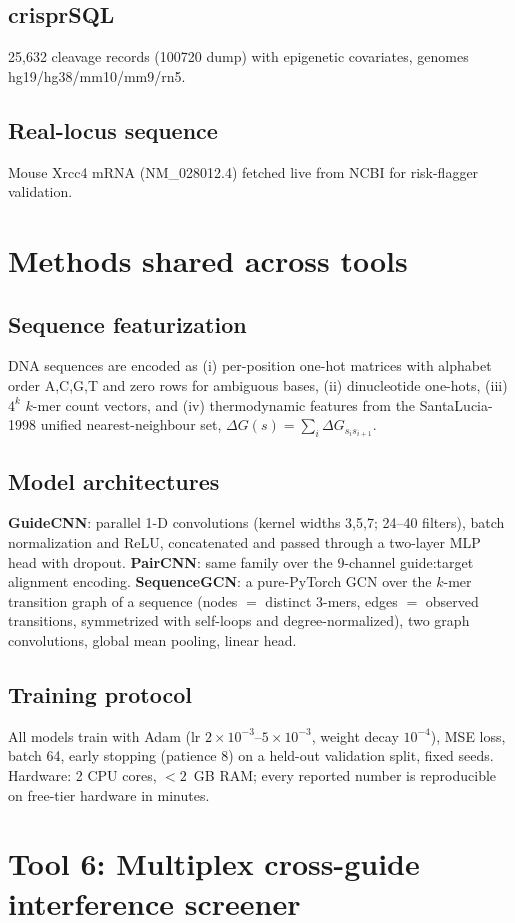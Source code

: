 \documentclass[12pt]{article}
\begin{document}
\subsection{crisprSQL}
25,632 cleavage records (100720 dump) with epigenetic covariates, genomes hg19/hg38/mm10/mm9/rn5.
\subsection{Real-locus sequence}
Mouse Xrcc4 mRNA (NM\_028012.4) fetched live from NCBI for risk-flagger validation.

\section{Methods shared across tools}
\subsection{Sequence featurization}
DNA sequences are encoded as (i) per-position one-hot matrices with alphabet
order A,C,G,T and zero rows for ambiguous bases, (ii) dinucleotide one-hots,
(iii) $4^k$ $k$-mer count vectors, and (iv) thermodynamic features from the
SantaLucia-1998 unified nearest-neighbour set, $\Delta G(s) = \sum_i \Delta G_{s_i s_{i+1}}$.
\subsection{Model architectures}
\textbf{GuideCNN}: parallel 1-D convolutions (kernel widths 3,5,7; 24--40
filters), batch normalization and ReLU, concatenated and passed through a
two-layer MLP head with dropout. \textbf{PairCNN}: same family over the
9-channel guide:target alignment encoding. \textbf{SequenceGCN}: a pure-PyTorch
GCN over the $k$-mer transition graph of a sequence (nodes $=$ distinct
3-mers, edges $=$ observed transitions, symmetrized with self-loops and
degree-normalized), two graph convolutions, global mean pooling, linear head.
\subsection{Training protocol}
All models train with Adam (lr $2\times10^{-3}$--$5\times10^{-3}$,
weight decay $10^{-4}$), MSE loss, batch 64, early stopping (patience 8) on a
held-out validation split, fixed seeds. Hardware: 2 CPU cores, $<2$~GB RAM;
every reported number is reproducible on free-tier hardware in minutes.

\section{Tool 6: Multiplex cross-guide interference screener}
\end{document}
